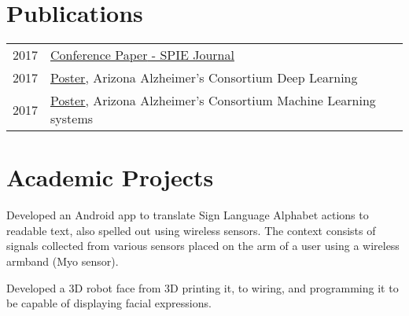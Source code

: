 \documentclass[hidelinks,letterpaper]{deedy-resume-openfont} %
\begin{document}
\begin{minipage}[t]{0.66\textwidth}



\section{Publications} 

\begin{tabular}{rl}
2017     & \href{https://www.researchgate.net/publication/321141639_Deep_Learning_based_Classification_of_FDG-PET_Data_for_Alzheimers_Disease_Categories}{\underline{Conference Paper} - SPIE Journal} \\
2017	 & \href{http://gsl.lab.asu.edu/archive/Posters/AAC2017_Singh_DeepLearning.pdf}{\underline{Poster}}, Arizona Alzheimer's Consortium Deep Learning\\
2017     & \href{http://gsl.lab.asu.edu/archive/Posters/AAC2017_Srivastava_3DPatch.pdf}{\underline{Poster}}, Arizona Alzheimer's Consortium Machine Learning systems\\
\end{tabular}


\sectionsep
\section{Academic Projects}

\small Developed an Android app to translate Sign Language Alphabet actions to readable text, also spelled out using wireless sensors. The context consists of signals collected from various sensors placed on the arm of a user using a wireless armband (Myo sensor). 

\small Developed a 3D robot face from 3D printing it, to wiring, and programming it to be capable of displaying facial expressions.


\end{minipage}
\end{document}

